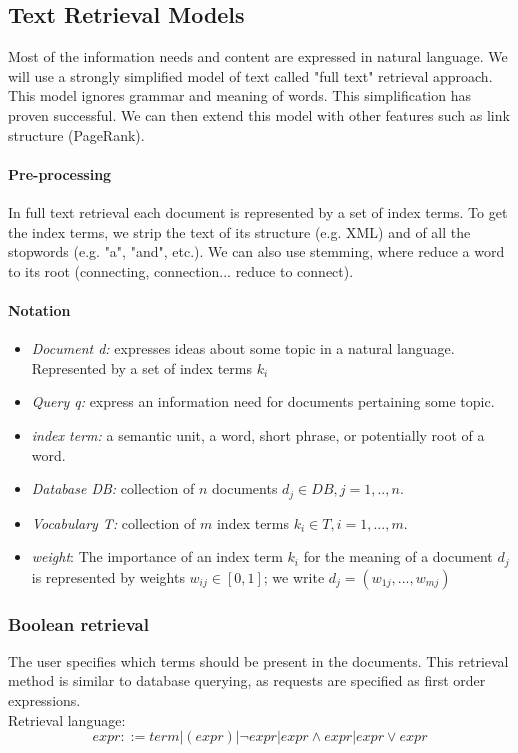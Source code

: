 \subsection{Text Retrieval Models}

Most of the information needs and content are expressed in natural language. We will use a strongly simplified model of text called "full text" retrieval approach. This model ignores grammar and meaning of words. This simplification has proven successful. We can then extend this model with other features such as link structure (PageRank).


\paragraph{Pre-processing}

In full text retrieval each document is represented by a set of index terms. To get the index terms, we strip the text of its structure (e.g. XML) and of all the stopwords (e.g. "a", "and", etc.). We can also use stemming, where reduce a word to its root ({connecting, connection...} reduce to connect). 

\paragraph{Notation}
\begin{itemize}
\item \textit{Document d:} expresses ideas about some topic in a natural language. Represented by a set of index terms $k_i$
\item \textit{Query q:} express an information need for documents pertaining some topic.
\item \textit{index term:} a semantic unit, a word, short phrase, or potentially root of a word.
\item \textit{Database DB:} collection of $n$ documents $d_j \in DB, j=1,..,n$.
\item \textit{Vocabulary T:} collection of $m$ index terms $k_i \in T, i=1,...,m$.
\item \textit{weight}: The importance of an index term $k_i$ for the meaning of a document $d_j$ is represented by weights $w_{ij} \in [0,1]$; we write $d_j = (w_{1j},...,w_{mj})$
\end{itemize}

\subsubsection{Boolean retrieval}
The user specifies which terms should be present in the documents. This retrieval method is similar to database querying, as requests are specified as first order expressions.
\\
Retrieval language:
\[ expr ::= term|(expr)|\neg expr|expr\land expr|expr \lor expr 
\]


